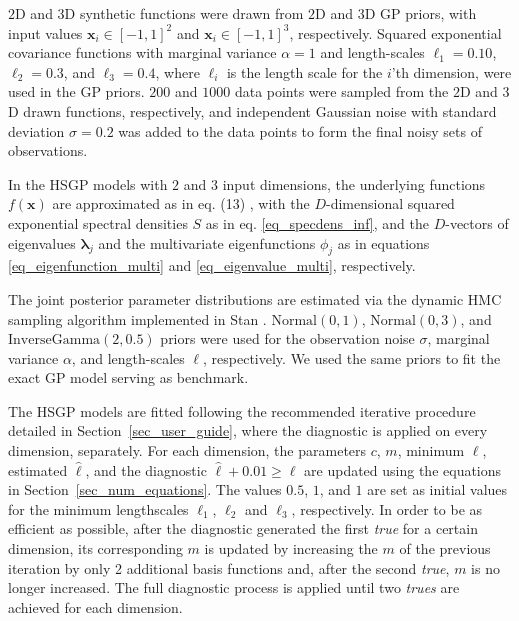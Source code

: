 {\color{blue} $2$D and $3$D synthetic functions were drawn from $2$D and $3$D GP priors, with input values $\bm{x}_i \in [-1,1]^2$ and $\bm{x}_i \in [-1,1]^3$, respectively. Squared exponential covariance functions with marginal variance $\alpha=1$ and length-scales $\ell_1=0.10$, $\ell_2=0.3$, and $\ell_3=0.4$, where $\ell_i$ is the length scale for the $i$'th dimension, were used in the GP priors. $200$ and $1000$ data points were sampled from the $2$D and $3$D drawn functions, respectively, and independent Gaussian noise with standard deviation $\sigma=0.2$ was added to the data points to form the final noisy sets of observations.}

In the HSGP models with $2$ and $3$ input dimensions, the underlying functions $f(\bm{x})$ are approximated as in eq. (13)%
, with the $D$-dimensional squared exponential spectral densities $S$ as in eq. \eqref{eq_specdens_inf}, and the $D$-vectors of eigenvalues $\bm{\lambda}_j$ and the multivariate eigenfunctions $\phi_j$ as in equations \eqref{eq_eigenfunction_multi} and \eqref{eq_eigenvalue_multi}, respectively.

The joint posterior parameter distributions are estimated via the dynamic HMC sampling algorithm implemented in Stan \citep{StanTeam:2021}. $\mathrm{Normal}(0,1)$, $\mathrm{Normal}(0,3)$, and $\mathrm{InverseGamma}(2,0.5)$ priors were used for the observation noise $\sigma$, marginal variance $\alpha$, and length-scales $\ell$, respectively. We used the same priors to fit the exact GP model serving as benchmark.

The HSGP models are fitted following the recommended iterative procedure detailed in Section~\ref{sec_user_guide}, where the diagnostic is applied on every dimension, separately. For each dimension, the parameters $c$, $m$, minimum $\ell$, estimated $\hat{\ell}$, and the diagnostic $\hat{\ell} + 0.01 \geq \ell$ are updated using the equations in Section~\ref{sec_num_equations}. The values $0.5$, $1$, and $1$ are set as initial values for the minimum lengthscales $\ell_1$, $\ell_2$ and $\ell_3$, respectively. In order to be as efficient as possible, after the diagnostic generated the first \textit{true} for a certain dimension, its corresponding $m$ is updated by increasing the $m$ of the previous iteration by only 2 additional basis functions and, after the second \textit{true}, $m$ is no longer increased. The full diagnostic process is applied until two \textit{trues} are achieved for each dimension. 

